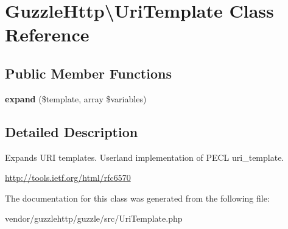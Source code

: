 \hypertarget{classGuzzleHttp_1_1UriTemplate}{}\section{Guzzle\+Http\textbackslash{}Uri\+Template Class Reference}
\label{classGuzzleHttp_1_1UriTemplate}
\subsection*{Public Member Functions}
\begin{DoxyCompactItemize}
\item 
\mbox{\label{classGuzzleHttp_1_1UriTemplate_a970177bd729e73b6064f270ed24af272}} 
{\bfseries expand} (\$template, array \$variables)
\end{DoxyCompactItemize}


\subsection{Detailed Description}
Expands U\+RI templates. Userland implementation of P\+E\+CL uri\+\_\+template.

\hyperlink{}{http\+://tools.\+ietf.\+org/html/rfc6570}

The documentation for this class was generated from the following file\+:\begin{DoxyCompactItemize}
\item 
vendor/guzzlehttp/guzzle/src/Uri\+Template.\+php\end{DoxyCompactItemize}

